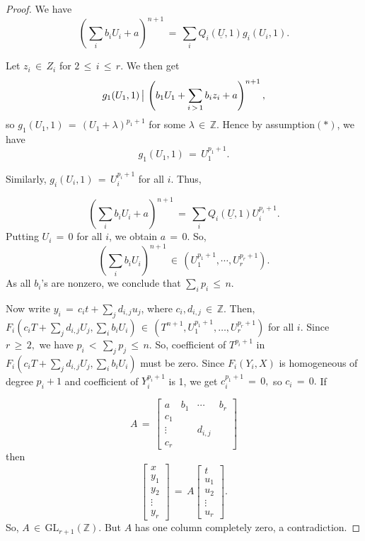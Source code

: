 \documentclass[12pt,reqno]{amsart}
\theoremstyle{definition}
\numberwithin{equation}{section}
\begin{document}
\begin{proof}
We have 
$$\left(\sum_{i}b_{i}U_{i}+a\right)^{n+1}\,=\, \sum_{i}Q_{i}(\underline{U},1)g_{i}(U_{i},1) . $$

Let $z_i\,\in\, Z_i$ for $2\,\leq\, i\, \leq\, r.$ We then get 
\begin{equation*}
g_{1}(U_{1},1) \,\big{\vert}\, \left(b_{1}U_{1}+\sum_{i\,>\,1}b_{i}z_{i}+a\right)^{n+1},
\end{equation*}
so $ g_{1}(U_{1},1)\,=\, (U_{1}+ \lambda)^{p_{1}+1}$ for some $ \lambda \,\in\, \mathbb{Z}.$ Hence by assumption$(\ast)$,  we have 
\begin{equation*}
g_{1}(U_{1},1)\,=\,U_{1}^{p_{1}+1}.
\end{equation*}

Similarly, $ g_{i}(U_{i},1)\,=\, U_{i}^{p_{i}+1}$ for all $i$. Thus,  

$$ \left(\sum_{i}b_{i}U_{i}+a\right)^{n+1}\,=\, \sum_{i}Q_{i}(\underline{U},1) U_{i}^{p_{i}+1}.$$ Putting $ U_{i}\,=\,0$ for all $i$, we obtain $a\,=\,0$. So,  
$$ \left(\sum_{i}b_{i}U_{i}\right)^{n+1} \,\in\, (U_{1}^{p_{1}+1},\cdots, U_{r}^{p_{r}+1}).$$ As all $b_i$'s are nonzero, we conclude that $\sum_{i}p_{i}\, \leq\, n. $

Now write $ y_{i}\,=\, c_{i}t + \sum _{j} d_{i,j}u_{j} $, where $c_i, d_{i,j}\,\in\, \mathbb{Z}.$ Then, $ F_{i} (c_{i}T+ \sum_{j}d_{i,j}U_{j}, \sum_{i}b_{i}U_{i}) \,\in\, (T^{n+1} , U_{1}^{p_{1}+1}, \dots ,U_{r}^{p_{r}+1})$ for all $i$.
Since $ r\,\geq\, 2, $ we have $ p_{i}\,<\, \sum_{j}p_{j}\, \leq\, n.$ So, coefficient of $ T^{p_{i}+1} $ in $ F_{i}(c_{i}T+\sum_{j}d_{i,j}U_{j}, \sum_{i}b_{i}U_{i}) $  must be zero. Since $F_{i}(Y_{i},X)$ is homogeneous of degree $ p_{i}+1$ and coefficient of $ Y_{i}^{p_{i}+1} $ is 1, we get $c_{i}^{p_{1}+1}\,=\,0, $ so $ c_{i}\,=\,0.$  If 

 \[ A\,=\,\begin{bmatrix}
a &b_{1}&\cdots &b_{r} \\
c_{1}& & &  \\
\vdots &   & d_{i,j} &    \\
c_{r}&  &  & 
\end{bmatrix}\] then 
\begin{equation}
 \begin{bmatrix}
x\\
y_1\\
y_2\\
\vdots\\
y_r
\end{bmatrix}
\,=\, A  \begin{bmatrix}
t\\
u_1\\
u_2\\
\vdots\\
u_r
\end{bmatrix}.
\end{equation}
So, $ A \,\in\, \textrm{GL}_{r+1}(\mathbb{Z}).$ But $A$ has one column completely zero, a contradiction.  


\end{proof}
\end{document}
